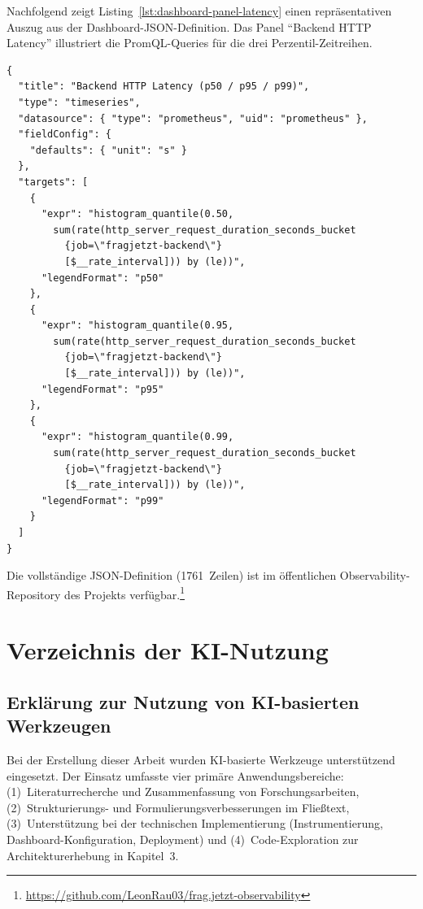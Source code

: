 Nachfolgend zeigt Listing~\ref{lst:dashboard-panel-latency} einen repräsentativen Auszug aus der Dashboard-JSON-Definition. Das Panel \enquote{Backend HTTP Latency} illustriert die PromQL-Queries für die drei Perzentil-Zeitreihen. \\

\begin{lstlisting}[style=jsonstyle, caption={Auszug aus der Dashboard-JSON: Panel \enquote{Backend HTTP Latency} (gekürzt).}, label={lst:dashboard-panel-latency}]
{
  "title": "Backend HTTP Latency (p50 / p95 / p99)",
  "type": "timeseries",
  "datasource": { "type": "prometheus", "uid": "prometheus" },
  "fieldConfig": {
    "defaults": { "unit": "s" }
  },
  "targets": [
    {
      "expr": "histogram_quantile(0.50,
        sum(rate(http_server_request_duration_seconds_bucket
          {job=\"fragjetzt-backend\"}
          [$__rate_interval])) by (le))",
      "legendFormat": "p50"
    },
    {
      "expr": "histogram_quantile(0.95,
        sum(rate(http_server_request_duration_seconds_bucket
          {job=\"fragjetzt-backend\"}
          [$__rate_interval])) by (le))",
      "legendFormat": "p95"
    },
    {
      "expr": "histogram_quantile(0.99,
        sum(rate(http_server_request_duration_seconds_bucket
          {job=\"fragjetzt-backend\"}
          [$__rate_interval])) by (le))",
      "legendFormat": "p99"
    }
  ]
}
\end{lstlisting}

Die vollständige JSON-Definition (1761~Zeilen) ist im öffentlichen Observability-Repository des Projekts verfügbar.\footnote{\url{https://github.com/LeonRau03/frag.jetzt-observability}}



\chapter{Verzeichnis der KI-Nutzung}
\label{ch:ki-nutzung}

\section{Erklärung zur Nutzung von KI-basierten Werkzeugen}
\label{app:ki-nutzung}

Bei der Erstellung dieser Arbeit wurden KI-basierte Werkzeuge unterstützend eingesetzt. Der Einsatz umfasste vier primäre Anwendungsbereiche: (1)~Literaturrecherche und Zusammenfassung von Forschungsarbeiten, (2)~Strukturierungs- und Formulierungsverbesserungen im Fließtext, (3)~Unterstützung bei der technischen Implementierung (Instrumentierung, Dashboard-Konfiguration, Deployment) und (4)~Code-Exploration zur Architekturerhebung in Kapitel~3.


